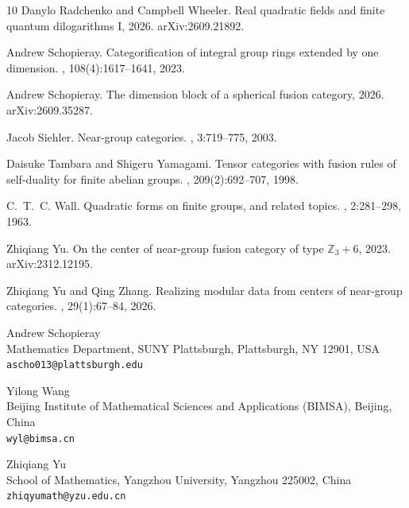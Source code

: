 \documentclass[10pt]{article}
\theoremstyle{plain}
\theoremstyle{definition}
\theoremstyle{plain}
\begin{document}
\begin{thebibliography}{10}
Danylo Radchenko and Campbell Wheeler.
\newblock Real quadratic fields and finite quantum dilogarithms {I}, 2026.
\newblock arXiv:2609.21892.

Andrew Schopieray.
\newblock Categorification of integral group rings extended by one dimension.
, 108(4):1617--1641, 2023.

Andrew Schopieray.
\newblock The dimension block of a spherical fusion category, 2026.
\newblock arXiv:2609.35287.

Jacob Siehler.
\newblock Near-group categories.
, 3:719--775, 2003.

Daisuke Tambara and Shigeru Yamagami.
\newblock Tensor categories with fusion rules of self-duality for finite
  abelian groups.
, 209(2):692--707, 1998.

C.~T.~C. Wall.
\newblock Quadratic forms on finite groups, and related topics.
, 2:281--298, 1963.

Zhiqiang Yu.
\newblock On the center of near-group fusion category of type
  {$\mathbb{Z}_3+6$}, 2023.
\newblock arXiv:2312.12195.

Zhiqiang Yu and Qing Zhang.
\newblock Realizing modular data from centers of near-group categories.
, 29(1):67--84, 2026.

\end{thebibliography}

\begin{flushleft}\small
Andrew Schopieray\\
Mathematics Department, SUNY Plattsburgh, Plattsburgh, NY 12901, USA\\
\texttt{ascho013@plattsburgh.edu}

\medskip
Yilong Wang\\
Beijing Institute of Mathematical Sciences and Applications (BIMSA), Beijing, China\\
\texttt{wyl@bimsa.cn}

\medskip
Zhiqiang Yu\\
School of Mathematics, Yangzhou University, Yangzhou 225002, China\\
\texttt{zhiqyumath@yzu.edu.cn}
\end{flushleft}
\end{document}
